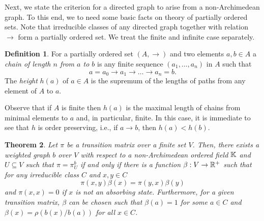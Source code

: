 \documentclass[a4paper,oneside, 12pt]{amsart}
\newtheorem{theorem}{Theorem}
\numberwithin{theorem}{section}
\theoremstyle{definition}
\newtheorem{definition}[theorem]{Definition}
\newcommand{\prob}{\pi}
\newcommand{\rw}{\beta}
\newcommand{\subsV}{U}
\begin{document}
{Next, we state the criterion for a directed graph to arise from a non-Archimedean graph. To this end, we to need some basic facts on theory  of partially ordered sets.
Note that irreducible classes  of any directed graph together with relation $\to$ form a partially ordered set. We treat the  finite and infinite case separately.
\begin{definition}
For a partially ordered set $(A, \to)$  and two elements $a,b\in A$  a \emph{chain of length $ n $ from $a$ to $b$}  is any finite sequence $(a_1,\ldots,a_{n})$  in  $ A$ such that 
$$
a=a_0\to a_1\to \dots\to a_n=b.
$$
The \emph{height} $ h(a) $  of $ a\in A $ is the supremum of the lengths of paths from any element of $ A $ to $ a $.
\end{definition}
Observe that if $ A  $ is finite then $ h(a) $ is the maximal length of chains from minimal elements to $ a $ and, in particular, finite. In this case, it is immediate to see that $ h $ is order preserving, i.e., if $ a\to b $, then $ h(a)<h(b) $.

\begin{theorem}\label{thm:finitevsdirected} Let $ \pi $ be a transition matrix over a finite set $ V $. Then, there exists a weighted graph $ b $ over $ V $ with respect to a non-Archimedean ordered field $\Bbb K$ and $\subsV\subseteq V$ such that $\pi=\pi_{U}^{b}$ if and only if  there is a function $\rw:V\to \Bbb R^+$ such that 
	for any irreducible class $C$ and  $x,y\in C$ 
	$$
	\prob(x,y)\rw(x)=\prob(y,x)\rw(y)
	$$
	and $ \pi(x,x)=0 $ if $ x $ is not an absorbing state.
	Furthermore, for a given transition matrix, $ \beta $ can be chosen such that $ \beta (a)=1 $ for some $ a\in C $ and $  \beta(x)=\rho (b(x)/b(a)) $ for all $ x\in C $.
\end{theorem}

}
\end{document}
